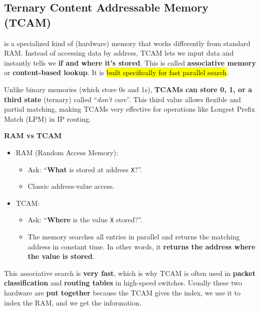 \subsection{Ternary Content Addressable Memory (TCAM)}

 is a specialized kind of (hardware) memory that works differently from standard RAM. Instead of accessing data by address, TCAM lets we input data and instantly tells we \textbf{if and where it's stored}. This is called \textbf{associative memory} or \textbf{content-based lookup}. It is \hl{built specifically for fast parallel search}.

\highspace
Unlike binary memories (which store 0s and 1s), \textbf{TCAMs can store 0, 1, or a third state} (ternary) called ``\emph{don't care}''. This third value allows flexible and partial matching, making TCAMs very effective for operations like Longest Prefix Match (LPM) in IP routing.

\highspace
\begin{flushleft}
    \textcolor{Green3}{ \textbf{RAM vs TCAM}}
\end{flushleft}
\begin{itemize}
    \item RAM (Random Access Memory):
    \begin{itemize}
        \item Ask: ``\textbf{What} is stored at address \texttt{X}?''.
        \item Classic address-value access.
    \end{itemize}

    \item TCAM:
    \begin{itemize}
        \item Ask: ``\textbf{Where} is the value \texttt{X} stored?''.
        \item The memory searches all entries in parallel and returns the matching address in constant time. In other words, it \textbf{returns the address where the value is stored}.
    \end{itemize}
\end{itemize}
This associative search is \textbf{very fast}, which is why TCAM is often used in \textbf{packet classification} and \textbf{routing tables} in high-speed switches. Usually these two hardware are \textbf{put together} because the TCAM gives the index, we use it to index the RAM, and we get the information.

